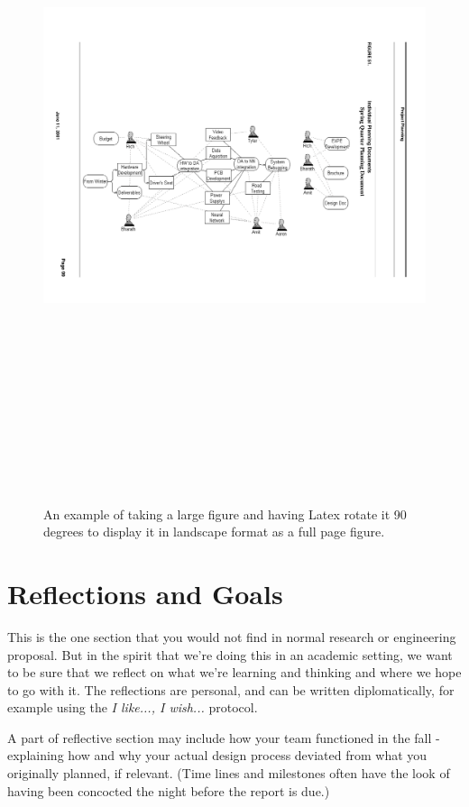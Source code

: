 \begin{figure}[p]   %
\centering
		\includegraphics[angle=90, height= 8in]{Figures/Ch6/ideastorm}
	\caption[Rotated landscape figure example]{An example of taking a large figure and having Latex rotate it 90 degrees to display it in landscape format as a full page figure.}
	\label{fig:full-page-example}  %
\end{figure}

\section{Reflections and Goals}
This is the one section that you would not find in normal research or engineering proposal. But in the spirit that we're doing this in an academic setting, we want to be sure that we reflect on what we're learning and thinking and where we hope to go with it. The reflections are personal, and can be written diplomatically, for example using the \emph{I like..., I wish...} protocol.

A part of reflective section may include how your team functioned in the fall - explaining how and why your actual design process deviated from what you originally planned, if relevant. (Time lines and milestones often have the look of having been concocted the night before the report is due.)
